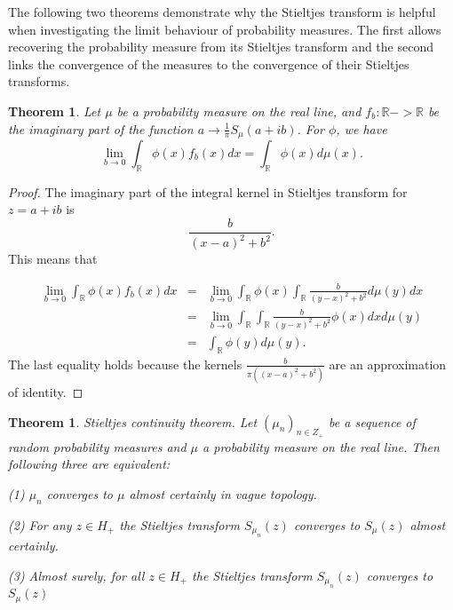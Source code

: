 \documentclass[12pt,a4paper,leqno]{report}
\newcommand{\R}{\mathbb{R}}
\theoremstyle{plain}
\newtheorem{theo}[equation]{Theorem}
\theoremstyle{definition}
\theoremstyle{remark}
\begin{document}
The following two theorems demonstrate why the Stieltjes transform is helpful when investigating the limit behaviour of probability measures. The first allows recovering the probability measure from its Stieltjes transform and the second links the convergence of the measures to the convergence of their Stieltjes transforms.

\begin{theo}
Let $\mu$ be a probability measure on the real line, and $f_b : \R -> \R$ be the imaginary part of the function $a  \to \frac{1}{\pi} S_{\mu}(a+ib)$.  For $\phi$, we have
\begin{equation*}
\lim_{b \to 0} \int_{\R} \phi(x) f_b (x) dx = \int_{\R} \phi(x) d\mu(x).
\end{equation*}
\end{theo}

\begin{proof}
The imaginary part of the integral kernel in Stieltjes transform for $z=a+ib$ is
\begin{equation*}
\frac{b}{(x-a)^2+b^2}.
\end{equation*}
This means that

\begin{eqnarray*}
\lim_{b \to 0} \int_{\R} \phi(x) f_b (x) dx & = & \lim_{b \to 0} \int_{\R} \phi(x) \int_{\R} \frac{b}{(y-x)^2+b^2} d\mu(y) dx\\
& = & \lim_{b \to 0} \int_{\R} \int_{\R} \frac{b}{(y-x)^2+b^2} \phi(x) dx d\mu(y)\\
& = & \int_{\R} \phi(y) d\mu(y).
\end{eqnarray*}
The last equality holds because the kernels $\frac{b}{\pi((x-a)^2+b^2)}$ are an approximation of identity.
\end{proof}

\begin{theo}
\emph{Stieltjes continuity theorem}. Let $(\mu_n)_{n \in Z_+}$ be a 
sequence of random probability measures and $\mu$ a probability measure on the real line. Then following three are equivalent:

(1) $\mu_n$ converges to $\mu$ almost certainly in vague topology.

(2) For any $z \in H_+$ the Stieltjes transform $S_{\mu_n}(z)$ converges to $S_{\mu}(z)$ almost certainly.

(3) Almost surely, for all $z \in H_+$ the Stieltjes transform $S_{\mu_n}(z)$ converges to $S_{\mu}(z)$
\end{theo}
\end{document}
